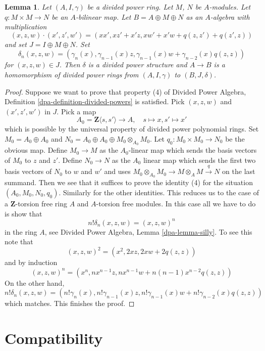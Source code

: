 \documentclass{stacks-project}
\theoremstyle{plain}
\newtheorem{lemma}[subsection]{Lemma}
\theoremstyle{definition}
\theoremstyle{remark}
\numberwithin{equation}{subsection}
\begin{document}
\begin{lemma}
\label{lemma-divided-power-second-order-thickening}
Let $(A, I, \gamma)$ be a divided power ring. Let $M$, $N$ be $A$-modules.
Let $q : M \times M \to N$ be an $A$-bilinear map.
Let $B = A \oplus M \oplus N$ as an $A$-algebra with multiplication
$$
(x, z, w)\cdot (x', z', w') = (xx', xz' + x'z, xw' + x'w + q(z, z') + q(z', z))
$$
and set $J = I \oplus M \oplus N$. Set
$$
\delta_n(x, z, w) = (\gamma_n(x), \gamma_{n - 1}(x)z,
\gamma_{n - 1}(x)w + \gamma_{n - 2}(x)q(z, z))
$$
for $(x, z, w) \in J$.
Then $\delta$ is a divided power structure and
$A \to B$ is a homomorphism of divided power rings from
$(A, I, \gamma)$ to $(B, J, \delta)$.
\end{lemma}

\begin{proof}
Suppose we want to prove that property (4) of
Divided Power Algebra, Definition \ref{dpa-definition-divided-powers}
is satisfied. Pick $(x, z, w)$ and $(x', z', w')$ in $J$.
Pick a map
$$
A_0 = \mathbf{Z}\langle s, s'\rangle \longrightarrow A,\quad
s \longmapsto x,
s' \longmapsto x'
$$
which is possible by the universal property of divided power
polynomial rings. Set $M_0 = A_0 \oplus A_0$ and
$N_0 = A_0 \oplus A_0 \oplus M_0 \otimes_{A_0} M_0$.
Let $q_0 : M_0 \times M_0 \to N_0$ be the obvious map.
Define $M_0 \to M$ as the $A_0$-linear map which sends
the basis vectors of $M_0$ to $z$ and $z'$. Define $N_0 \to N$
as the $A_0$ linear map which sends the first two basis vectors
of $N_0$ to $w$ and $w'$ and uses
$M_0 \otimes_{A_0} M_0 \to M \otimes_A M \xrightarrow{q} N$
on the last summand. Then we see that it suffices to prove the
identity (4) for the situation $(A_0, M_0, N_0, q_0)$.
Similarly for the other identities. This reduces us to the case
of a $\mathbf{Z}$-torsion free ring $A$ and $A$-torsion free modules.
In this case all we have to do is show that
$$
n! \delta_n(x, z, w) = (x, z, w)^n
$$
in the ring $A$, see Divided Power Algebra, Lemma \ref{dpa-lemma-silly}.
To see this note that
$$
(x, z, w)^2 = (x^2, 2xz, 2xw + 2q(z, z))
$$
and by induction
$$
(x, z, w)^n = (x^n, nx^{n - 1}z, nx^{n - 1}w + n(n - 1)x^{n - 2}q(z, z))
$$
On the other hand,
$$
n! \delta_n(x, z, w) = (n!\gamma_n(x), n!\gamma_{n - 1}(x)z,
n!\gamma_{n - 1}(x)w + n!\gamma_{n - 2}(x) q(z, z))
$$
which matches. This finishes the proof.
\end{proof}




\section{Compatibility}
\label{section-compatibility}
\end{document}
